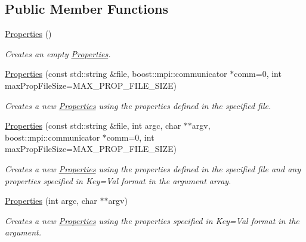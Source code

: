 \subsection*{Public Member Functions}
\begin{DoxyCompactItemize}
\item 
\hypertarget{classrepast_1_1_properties_ab34048edde5f078749499e54ae33b092}{\hyperlink{classrepast_1_1_properties_ab34048edde5f078749499e54ae33b092}{Properties} ()}\label{classrepast_1_1_properties_ab34048edde5f078749499e54ae33b092}

\begin{DoxyCompactList}\small\item\em Creates an empty \hyperlink{classrepast_1_1_properties}{Properties}. \end{DoxyCompactList}\item 
\hyperlink{classrepast_1_1_properties_a23c9d9635eb8cf61b877692abf4d94b8}{Properties} (const std\-::string \&file, boost\-::mpi\-::communicator $\ast$comm=0, int max\-Prop\-File\-Size=M\-A\-X\-\_\-\-P\-R\-O\-P\-\_\-\-F\-I\-L\-E\-\_\-\-S\-I\-Z\-E)
\begin{DoxyCompactList}\small\item\em Creates a new \hyperlink{classrepast_1_1_properties}{Properties} using the properties defined in the specified file. \end{DoxyCompactList}\item 
\hyperlink{classrepast_1_1_properties_a15f789bec63f21941cd4d88a77c327c3}{Properties} (const std\-::string \&file, int argc, char $\ast$$\ast$argv, boost\-::mpi\-::communicator $\ast$comm=0, int max\-Prop\-File\-Size=M\-A\-X\-\_\-\-P\-R\-O\-P\-\_\-\-F\-I\-L\-E\-\_\-\-S\-I\-Z\-E)
\begin{DoxyCompactList}\small\item\em Creates a new \hyperlink{classrepast_1_1_properties}{Properties} using the properties defined in the specified file and any properties specified in Key=Val format in the argument array. \end{DoxyCompactList}\item 
\hyperlink{classrepast_1_1_properties_ab4edc85145fddc5d6dbd3dbf4d074ef7}{Properties} (int argc, char $\ast$$\ast$argv)
\begin{DoxyCompactList}\small\item\em Creates a new \hyperlink{classrepast_1_1_properties}{Properties} using the properties specified in Key=Val format in the argument. \end{DoxyCompactList}\item 

\end{DoxyCompactItemize}
